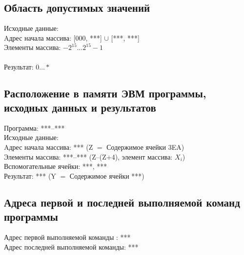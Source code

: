 \subsection*{Область допустимых значений}
\noindent Исходные данные: \\
Aдрес начала массива: [000, ***] $\cup$ [***, ***] \\
Элементы массива: $-2^{15}\ldots2^{15}-1$\\\\
Результат: $0\ldots*$

\subsection{Расположение в памяти ЭВМ программы, исходных данных и результатов}
\noindent Программа: ***--*** \\
Исходные данные: \\
Aдрес начала массива: *** (Z $=$ Содержимое ячейки 3EA) \\
Элементы массива: ***--*** (Z--(Z$+$4), элемент массива: $X_{i}$) \\
Вспомогательные ячейки: ***, *** \\
Результат: *** (Y $=$ Содержимое ячейки ***)

\subsection{Адреса первой и последней выполняемой команд программы}
\noindent Адрес первой выполняемой команды : *** \\
Адрес последней выполняемой команды: ***

